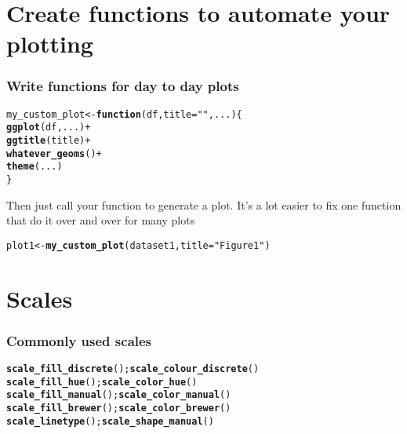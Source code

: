 \documentclass{beamer}\usepackage[]{graphicx}\usepackage[]{color}
\makeatletter
\newcommand{\hlstr}[1]{\textcolor[rgb]{0.192,0.494,0.8}{#1}}%
\newcommand{\hlkwd}[1]{\textcolor[rgb]{0.737,0.353,0.396}{\textbf{#1}}}%
\newenvironment{kframe}{%
 \def\at@end@of@kframe{}%
 \ifinner\ifhmode%
  \def\at@end@of@kframe{\end{minipage}}%
  \begin{minipage}{\columnwidth}%
 \fi\fi%
 \def\FrameCommand##1{\hskip\@totalleftmargin \hskip-\fboxsep
 \colorbox{shadecolor}{##1}\hskip-\fboxsep
     \hskip-\linewidth \hskip-\@totalleftmargin \hskip\columnwidth}%
 \MakeFramed {\advance\hsize-\width
   \@totalleftmargin\z@ \linewidth\hsize
   \@setminipage}}%
 {\par\unskip\endMakeFramed%
 \at@end@of@kframe}
\newenvironment{knitrout}{}{} %
\makeatother
\begin{document}
\section*{Create functions to automate your plotting}
\frame{\sectionpage}

\begin{frame}[fragile]
\frametitle{Write functions for day to day plots}
\begin{knitrout}\footnotesize
{}\color{fgcolor}\begin{kframe}
\begin{alltt}
my_custom_plot <- \hlkwd{function}(df, title = \hlstr{""}, ...) \{
    \hlkwd{ggplot}(df, ...) +
    \hlkwd{ggtitle}(title) +
    \hlkwd{whatever_geoms}() +
    \hlkwd{theme}(...)
\}
\end{alltt}
\end{kframe}
\end{knitrout}


Then just call your function to generate a plot.
It's a lot easier to fix one function that do it over and over for many plots
\begin{knitrout}\footnotesize
{}\color{fgcolor}\begin{kframe}
\begin{alltt}
plot1 <- \hlkwd{my_custom_plot}(dataset1, title = \hlstr{"Figure 1"})
\end{alltt}
\end{kframe}
\end{knitrout}



\end{frame}

\section*{Scales}
\frame{\sectionpage}

\begin{frame}[fragile]
\frametitle{Commonly used scales}
\begin{knitrout}\footnotesize
{}\color{fgcolor}\begin{kframe}
\begin{alltt}
\hlkwd{scale_fill_discrete}(); \hlkwd{scale_colour_discrete}()
\hlkwd{scale_fill_hue}(); \hlkwd{scale_color_hue}()
\hlkwd{scale_fill_manual}();  \hlkwd{scale_color_manual}()
\hlkwd{scale_fill_brewer}(); \hlkwd{scale_color_brewer}()
\hlkwd{scale_linetype}(); \hlkwd{scale_shape_manual}()
\end{alltt}
\end{kframe}
\end{knitrout}

\end{frame}
\end{document}
